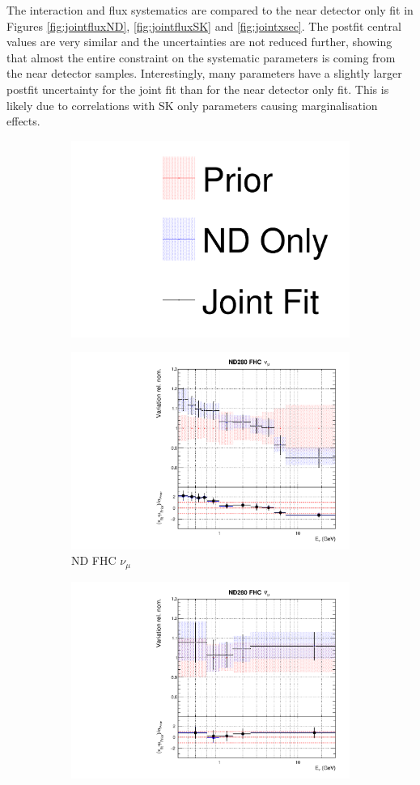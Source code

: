 The interaction and flux systematics are compared to the near detector only fit in Figures \ref{fig:jointfluxND}, \ref{fig:jointfluxSK} and  \ref{fig:jointxsec}. The postfit central values are very similar and the uncertainties are not reduced further, showing that almost the entire constraint on the systematic parameters is coming from the near detector samples. Interestingly, many parameters have a slightly larger postfit uncertainty for the joint fit than for the near detector only fit. This is likely due to correlations with SK only parameters causing marginalisation effects.

\begin{figure}
\centering
\begin{subfigure}{0.8\textwidth}
  \centering
  \includegraphics[width=0.24\linewidth]{figs/joint_leg}
\end{subfigure}
\begin{subfigure}{0.45\textwidth}
  \centering
  \includegraphics[width=0.75\linewidth]{figs/jointflux0}
  \caption{ND FHC $\nu_{\mu}$}
\end{subfigure}
\begin{subfigure}{0.45\textwidth}
  \centering
  \includegraphics[width=0.75\linewidth]{figs/jointflux1}

\end{subfigure}
\end{figure}
